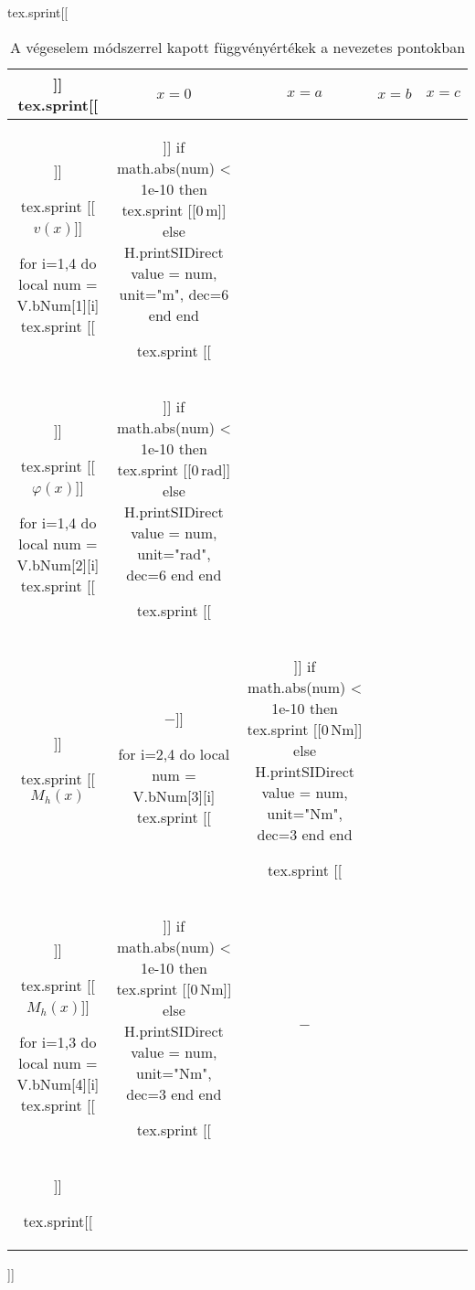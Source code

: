 \begin{table}[H]
\centering
\caption{A végeselem módszerrel kapott függvényértékek a nevezetes pontokban}
\sifix{}
\def\arraystretch{1.25}
\begin{luacode*}
  tex.sprint[[\begin{tabular}{c|c|c|c|c|}]]
  tex.sprint[[& $x = 0$ & $x = a$ & $x = b$ & $x = c$ \\\hline]]

  tex.sprint [[$v(x)$]]

  for i=1,4 do
    local num = V.bNum[1][i]
    tex.sprint [[&]]
    if math.abs(num) < 1e-10 then
      tex.sprint [[$0\,\mathrm{m}$]]
    else
      H.printSIDirect { value = num, unit="m", dec=6 }
    end
  end

  tex.sprint [[\\]]

  tex.sprint [[$\varphi(x)$]]

  for i=1,4 do
    local num = V.bNum[2][i]
    tex.sprint [[&]]
    if math.abs(num) < 1e-10 then
      tex.sprint [[$0\,\mathrm{rad}$]]
    else
      H.printSIDirect { value = num, unit="rad", dec=6 }
    end
  end

  tex.sprint [[\\]]

  tex.sprint [[$M_h(x)$ & $-$]]

  for i=2,4 do
    local num = V.bNum[3][i]
    tex.sprint [[&]]
    if math.abs(num) < 1e-10 then
      tex.sprint [[$0\,\mathrm{Nm}$]]
    else
      H.printSIDirect { value = num, unit="Nm", dec=3 }
    end
  end

  tex.sprint [[\\]]

  tex.sprint [[$M_h(x)$]]

  for i=1,3 do
    local num = V.bNum[4][i]
    tex.sprint [[&]]
    if math.abs(num) < 1e-10 then
      tex.sprint [[$0\,\mathrm{Nm}$]]
    else
      H.printSIDirect { value = num, unit="Nm", dec=3 }
    end
  end

  tex.sprint [[&$-$\\\hline]]

  tex.sprint[[\end{tabular}]]
\end{luacode*}
\end{table}
